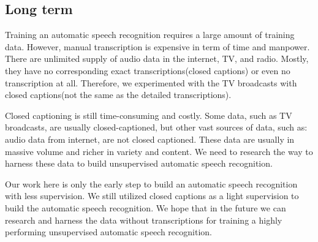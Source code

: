 \subsection{Long term}
Training an automatic speech recognition requires a large amount of training data. However, manual transcription is expensive in term of time and manpower. There are unlimited supply of audio data in the internet, TV, and radio. Mostly, they have no corresponding exact transcriptions(closed captions) or even no transcription at all. Therefore, we experimented with the TV broadcasts with closed captions(not the same as the detailed transcriptions). 

Closed captioning is still time-consuming and costly. Some data, such as TV broadcasts, are usually closed-captioned, but other vast sources of data, such as: audio data from internet, are not closed captioned. These data are usually in massive volume and richer in variety and content. We need to research the way to harness these data to build unsupervised automatic speech recognition.

 Our work here is only the early step to build an automatic speech recognition with less supervision. We still utilized closed captions as a light supervision to build the   automatic speech recognition. We hope that in the future we can research and harness the data without transcriptions for training a highly performing unsupervised automatic speech recognition.